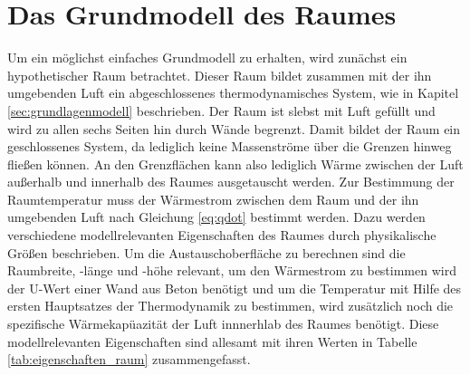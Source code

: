 \section{Das Grundmodell des Raumes}
Um ein möglichst einfaches Grundmodell zu erhalten, wird zunächst ein hypothetischer Raum betrachtet. Dieser Raum bildet zusammen mit der ihn umgebenden Luft ein abgeschlossenes thermodynamisches System, wie in Kapitel \ref{sec:grundlagenmodell} beschrieben. Der Raum ist slebst mit Luft gefüllt und wird zu allen sechs Seiten hin durch Wände begrenzt. Damit bildet der Raum ein geschlossenes System, da lediglich keine Massenströme über die Grenzen hinweg fließen können. An den Grenzflächen kann also lediglich Wärme zwischen der Luft außerhalb und innerhalb des Raumes ausgetauscht werden. 
Zur Bestimmung der Raumtemperatur muss der Wärmestrom zwischen dem Raum und der ihn umgebenden Luft nach Gleichung \ref{eq:qdot} bestimmt werden. Dazu werden verschiedene modellrelevanten Eigenschaften des Raumes durch physikalische Größen beschrieben. Um die Austauschoberfläche zu berechnen sind die Raumbreite, -länge und -höhe relevant, um den Wärmestrom zu bestimmen wird der U-Wert einer Wand aus Beton benötigt und um die Temperatur mit Hilfe des ersten Hauptsatzes der Thermodynamik zu bestimmen, wird zusätzlich noch die spezifische Wärmekapüazität der Luft innnerhlab des Raumes benötigt.
Diese modellrelevanten Eigenschaften sind allesamt mit ihren Werten in Tabelle \ref{tab:eigenschaften_raum} zusammengefasst.

